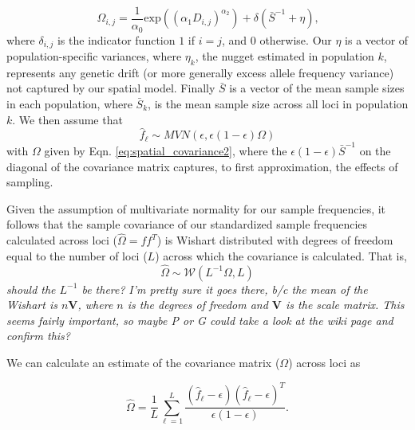 \documentclass[12pt]{article}
\newcommand{\gb}[1]{{\em \color{magenta} #1}}
\newcommand{\plr}[1]{{\em \color{green} #1}}
\newcommand{\gc}[1]{{\em \color{blue} #1}}
\begin{document}
\begin{equation}
\label{eq:spatial_covariance2}
\Omega_{i,j} = \frac{1}{\alpha_0} \text{exp} \left(	\left( \alpha_1D_{i,j} \right)^{\alpha_2} \right) + \delta(\bar{S}^{-1} + \eta) \text{,}
\end{equation}
where $\delta_{i,j}$ is the indicator function $1$ if $i=j$, and $0$ otherwise. Our $\eta$ is a vector of population-specific variances, where $\eta_k$, the nugget estimated in population $k$, represents any genetic drift (or more generally excess allele frequency variance) not captured by our spatial model. Finally $\bar{S}$ is a vector of the mean sample sizes in each population, where $\bar{S}_k$, is the mean sample size across all loci in population $k$.  We then assume that
\begin{equation}
\hat{f}_{\ell} \sim MVN(\epsilon, \epsilon (1-\epsilon)\Omega)
\end{equation}
with $\Omega$ given by Eqn. \eqref{eq:spatial_covariance2},  where the $\epsilon(1-\epsilon)  \bar{S}^{-1}$ on the diagonal of the covariance matrix captures, to first approximation, the effects of sampling.

Given the assumption of multivariate normality for our sample frequencies, it follows that the sample covariance of our standardized sample frequencies calculated across loci ($\widehat{\Omega} = f f^T$)  is Wishart distributed with degrees of freedom equal to the number of loci ($L$) across which the covariance is calculated.
That is, 
\begin{equation}
\label{eq:wishart_dist}
\widehat{\Omega} \sim \mathcal{W}\left( L^{-1} \Omega, L	\right)
\end{equation}
\gc{should the $L^{-1}$ be there?} \gb{I'm pretty sure it goes there, b/c the mean of the Wishart is $n\textbf{V}$, where $n$ is the degrees of freedom and $\textbf{V}$ is the scale matrix.  This seems fairly important, so maybe \plr{P} or \gc{G} could take a look at the wiki page and confirm this?} 

We can calculate an estimate of the covariance matrix ($\Omega$) across loci as 

\begin{equation}
\label{eq:sample_cov}
\widehat{\Omega} = \frac{1}{L} \sum_{\ell=1}^{L} \frac{(\hat{f}_{\ell}  - \epsilon) (\hat{f}_{\ell}  - \epsilon)^T}{\epsilon(1-\epsilon)} \text{.}
\end{equation}
\end{document}
